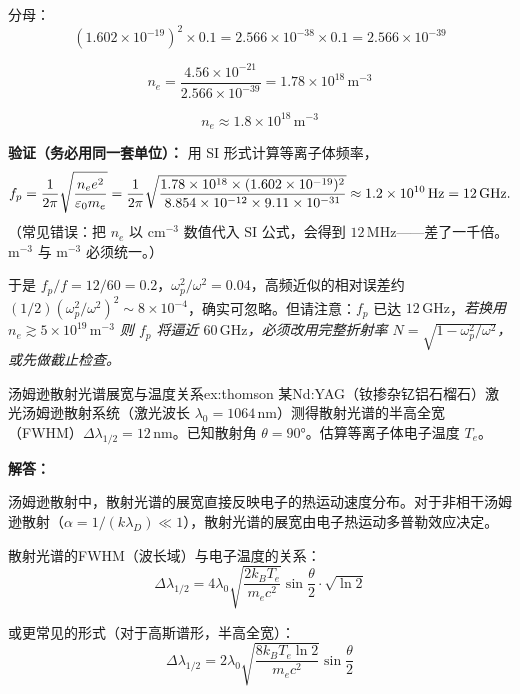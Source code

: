 分母：
\[
    (1.602\times10^{-19})^2 \times 0.1 = 2.566\times10^{-38} \times 0.1 = 2.566\times10^{-39}
\]

\[
    n_e = \frac{4.56\times10^{-21}}{2.566\times10^{-39}} = 1.78\times10^{18}\,\mathrm{m^{-3}}
\]

\[
    \boxed{n_e \approx 1.8\times10^{18}\,\mathrm{m^{-3}}}
\]

\textbf{验证（务必用同一套单位）：} 用 SI 形式计算等离子体频率，
\[
    f_p = \frac{1}{2\pi}\sqrt{\frac{n_e e^2}{\varepsilon_0 m_e}}
    = \frac{1}{2\pi}\sqrt{\frac{1.78\times10^{18}\times(1.602\times10^{-19})^2}{8.854\times10^{-12}\times9.11\times10^{-31}}}
    \approx 1.2\times10^{10}\,\mathrm{Hz} = 12\,\mathrm{GHz}.
\]
（常见错误：把 $n_e$ 以 $\mathrm{cm^{-3}}$ 数值代入 $\mathrm{SI}$ 公式，会得到 $12\,\mathrm{MHz}$——差了一千倍。$\mathrm{m^{-3}}$ 与 $\mathrm{m^{-3}}$ 必须统一。）

于是 $f_p/f = 12/60 = 0.2$，$\omega_p^2/\omega^2 = 0.04$，高频近似的相对误差约 $(1/2)(\omega_p^2/\omega^2)^2 \sim 8\times10^{-4}$，确实可忽略。但请注意：$f_p$ 已达 $12\,\mathrm{GHz}$，\emph{若换用 $n_e\gtrsim5\times10^{19}\,\mathrm{m^{-3}}$ 则 $f_p$ 将逼近 $60\,\mathrm{GHz}$，必须改用完整折射率 $N=\sqrt{1-\omega_p^2/\omega^2}$，或先做截止检查。}


\begin{example}{汤姆逊散射光谱展宽与温度关系}{ex:thomson}
某Nd:YAG（钕掺杂钇铝石榴石）激光汤姆逊散射系统（激光波长 $\lambda_0 = 1064\,\mathrm{nm}$）测得散射光谱的半高全宽（FWHM）$\Delta\lambda_{1/2} = 12\,\mathrm{nm}$。已知散射角 $\theta = 90°$。估算等离子体电子温度 $T_e$。
\end{example}

\textbf{解答：}

汤姆逊散射中，散射光谱的展宽直接反映电子的热运动速度分布。对于非相干汤姆逊散射（$\alpha = 1/(k\lambda_D) \ll 1$），散射光谱的展宽由电子热运动多普勒效应决定。

散射光谱的FWHM（波长域）与电子温度的关系：
\[
    \Delta\lambda_{1/2} = 4\lambda_0 \sqrt{\frac{2k_B T_e}{m_e c^2}} \sin\frac{\theta}{2} \cdot \sqrt{\ln 2}
\]

或更常见的形式（对于高斯谱形，半高全宽）：
\begin{equation}
    \Delta\lambda_{1/2} = 2\lambda_0 \sqrt{\frac{8k_B T_e \ln 2}{m_e c^2}} \sin\frac{\theta}{2}
\label{eq:ch12-thomson-fwhm}
\end{equation}

